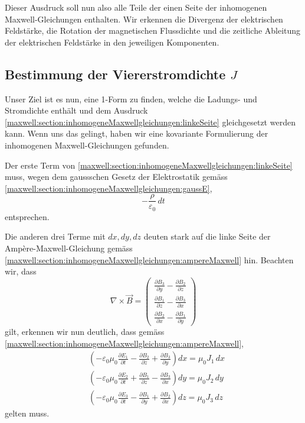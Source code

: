 Dieser Ausdruck soll nun also alle Teile der einen Seite der inhomogenen Maxwell-Gleichungen enthalten.
Wir erkennen die Divergenz der elektrischen Feldstärke, die Rotation der magnetischen Flussdichte und die zeitliche Ableitung der elektrischen Feldstärke in den jeweiligen Komponenten.
\subsection{Bestimmung der Viererstromdichte $J$}

Unser Ziel ist es nun, eine 1-Form zu finden, welche die Ladungs- und Stromdichte enthält und dem Ausdruck \eqref{maxwell:section:inhomogeneMaxwellgleichungen:linkeSeite} gleichgesetzt werden kann.
Wenn uns das gelingt, haben wir eine kovariante Formulierung der inhomogenen Maxwell-Gleichungen gefunden.

Der erste Term von \eqref{maxwell:section:inhomogeneMaxwellgleichungen:linkeSeite} muss, wegen dem gaussschen Gesetz der Elektrostatik gemäss \eqref{maxwell:section:inhomogeneMaxwellgleichungen:gaussE}, 
\begin{equation*}
	-\frac{\rho}{\varepsilon_0} \,dt
\end{equation*}
entsprechen.

Die anderen drei Terme mit $dx,dy,dz$ deuten stark auf die linke Seite der Ampère-Maxwell-Gleichung gemäss \eqref{maxwell:section:inhomogeneMaxwellgleichungen:ampereMaxwell} hin.
Beachten wir, dass 
\begin{equation*}
	\nabla \times \vec{B} = 
	\begin{pmatrix}
		\frac{\partial B_3}{\partial y} - \frac{\partial B_2}{\partial z}\\[1ex]
		\frac{\partial B_1}{\partial z} - \frac{\partial B_3}{\partial x}\\[1ex]
		\frac{\partial B_2}{\partial x} - \frac{\partial B_1}{\partial y}
	\end{pmatrix}
\end{equation*}
gilt, erkennen wir nun deutlich, dass gemäss \eqref{maxwell:section:inhomogeneMaxwellgleichungen:ampereMaxwell},
\begin{align*}
	&\left(-\varepsilon_0\mu_0\frac{\partial E_1}{\partial t} - \frac{\partial B_2}{\partial z} + \frac{\partial B_3}{\partial y} \right) dx = \mu_0 J_1 \, dx\\
	&\left( -\varepsilon_0\mu_0\frac{\partial E_2}{\partial t} + \frac{\partial B_1}{\partial z} - \frac{\partial B_3}{\partial x} \right) dy = \mu_0 J_2 \, dy\\
	&\left( -\varepsilon_0\mu_0\frac{\partial E_3}{\partial t} - \frac{\partial B_1}{\partial y} + \frac{\partial B_2}{\partial x} \right) dz = \mu_0 J_3 \, dz
\end{align*}
gelten muss.

